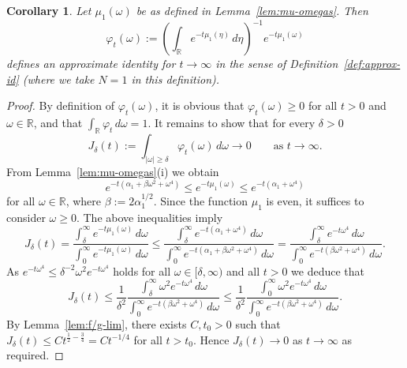 \documentclass[a4paper, reqno]{amsart}
\numberwithin{equation}{section}
\theoremstyle{plain}
\newtheorem{corollary}[theorem]{Corollary}
\theoremstyle{definition}
\theoremstyle{remark}
\newcommand{\RR}{\mathbb{R}}
\begin{document}
\begin{corollary}
  \label{cor:approx-id-mu}
  Let $\mu_1(\omega)$ be as defined in Lemma~\ref{lem:mu-omegas}. Then
  \begin{equation*}
    \varphi_t(\omega) := \left(\int_{\RR} e^{-t \mu_1(\eta)} \,d\eta \right)^{-1}e^{-t\mu_1(\omega)}
  \end{equation*}
  defines an approximate identity for $t \to \infty$ in the sense of Definition~\ref{def:approx-id} (where we take $N=1$ in this definition).
\end{corollary}
\begin{proof}
  By definition of $\varphi_t(\omega)$, it is obvious that $\varphi_t(\omega) \geq 0$ for all $t>0$ and $\omega \in \RR$, and that $\int_\RR \varphi_t \,d\omega = 1$. It remains to show that for every $\delta>0$
  \begin{equation}
    \label{eq:approx-id-mu}
    J_\delta(t):=\int_{|\omega| \ge \delta} \varphi_t(\omega) \,d \omega \longrightarrow 0 \qquad \text{as } t \to \infty.
  \end{equation}
  From Lemma~\ref{lem:mu-omegas}(i) we obtain
  \begin{equation*}
    e^{-t(\alpha_1 + \beta \omega^2 + \omega^4)} \leq e^{-t \mu_1(\omega)} \leq e^{-t(\alpha_1 + \omega^4)}
  \end{equation*}
  for all $\omega \in \RR$, where $\beta := 2 \alpha_1^{1/2}$. Since the function $\mu_1$ is even, it suffices to consider $\omega \ge 0$. The above inequalities imply
  \begin{equation*}
    J_\delta(t)
    = \frac{ \int_\delta^\infty e^{-t \mu_1(\omega)}\,d \omega }{ \int_0^\infty e^{-t \mu_1(\omega)} \,d \omega }
    \leq \frac{ \int_\delta^\infty e^{-t(\alpha_1 + \omega^4)} \,d\omega}
    { \int_0^\infty e^{-t(\alpha_1 + \beta \omega^2 + \omega^4)} \,d\omega }
    = \frac{ \int_\delta^\infty e^{-t \omega^4} \,d\omega }
    { \int_0^\infty e^{-t(\beta \omega^2 + \omega^4)} \,d\omega }.
  \end{equation*}
  As $e^{-t \omega^4} \leq \delta^{-2} \omega^2 e^{-t\omega^4}$ holds for all $\omega \in [\delta, \infty)$ and all $t>0$ we deduce that
  \begin{equation*}
    J_\delta(t)
    \leq \frac{1}{\delta^2}
    \frac{ \int_\delta^\infty \omega^2 e^{-t \omega^4} \,d\omega }
    { \int_0^\infty e^{-t(\beta \omega^2 + \omega^4)} \,d\omega }
    \leq \frac{1}{\delta^2}
    \frac{ \int_0^\infty \omega^2 e^{-t \omega^4} \,d\omega }
    { \int_0^\infty e^{-t(\beta \omega^2 + \omega^4)} \,d\omega }.
  \end{equation*}
  By Lemma~\ref{lem:f/g-lim}, there exists $C,t_0>0$ such that $J_\delta(t)\leq Ct^{\frac{1}{2}-\frac{3}{4}}=Ct^{-1/4}$ for all $t>t_0$. Hence $J_\delta(t)\to 0$ as $t\to\infty$ as required.
\end{proof}
\end{document}
